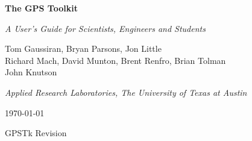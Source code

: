 
\begin{titlepage}

\begin{center}

\addvspace{30pt}


{ \Huge\bf The GPS Toolkit }

\addvspace{10pt}

{ \huge\it A User's Guide for Scientists, Engineers and Students }

\addvspace{60pt}

Tom Gaussiran, Bryan Parsons, Jon Little \\
Richard Mach, David Munton, Brent Renfro, Brian Tolman \\
John Knutson

\addvspace{3pt}
{ \it Applied Research Laboratories, The University of Texas at Austin}


\addvspace{60pt}

\today



GPSTk Revision 

\end {center}

\end{titlepage}

